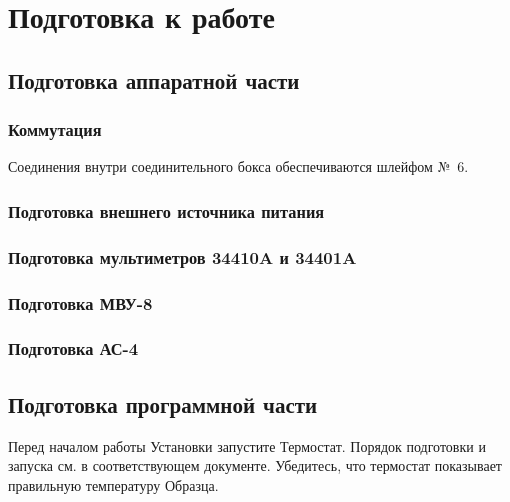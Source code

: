 \documentclass[12pt, a4paper, twocolumn]{report}
\begin{document}
\chapter{Подготовка к работе}

\section{Подготовка аппаратной части}

\subsection{Коммутация}

Соединения внутри соединительного бокса обеспечиваются шлейфом №~6.



\subsection{Подготовка внешнего источника питания}



\subsection{Подготовка мультиметров 34410A и 34401A}



\subsection{Подготовка МВУ-8}



\subsection{Подготовка АС-4}



\section{Подготовка программной части}

Перед началом работы Установки запустите Термостат. Порядок подготовки и запуска см. в соответствующем документе. Убедитесь, что термостат показывает правильную температуру Образца.
\end{document}
